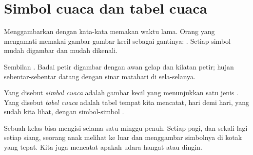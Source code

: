 \section{Simbol cuaca dan tabel cuaca}

Menggambarkan  dengan kata-kata memakan waktu lama. Orang yang
mengamati  memakai gambar-gambar kecil sebagai gantinya: . Setiap simbol mudah digambar dan mudah dikenali.

\begin{omfigure}

{\small Sembilan . Badai petir digambar dengan awan gelap dan
kilatan petir; hujan sebentar-sebentar datang dengan sinar matahari di sela-selanya.}
\end{omfigure}

\begin{definition}\label{def:g1:watching-the-weather:weather-chart}
Yang disebut \emph{simbol cuaca} adalah gambar kecil
yang menunjukkan satu jenis . Yang disebut \emph{tabel cuaca}
adalah tabel tempat kita mencatat, hari demi hari,  yang sudah kita
lihat, dengan simbol-simbol .
\end{definition}

Sebuah kelas bisa mengisi  selama satu minggu penuh. Setiap
pagi, dan sekali lagi setiap siang, seorang anak melihat ke luar dan
menggambar simbolnya di kotak yang tepat. Kita juga mencatat apakah udara
hangat atau dingin.

